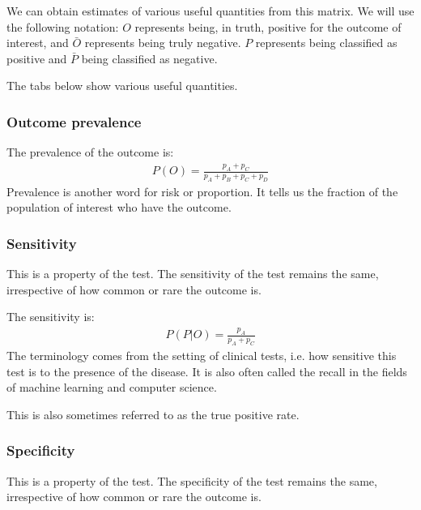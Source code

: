 \documentclass[letterpaper,10pt,english]{jupyterBook}
\begin{document}
\sphinxAtStartPar
We can obtain estimates of various useful quantities from this matrix. We will use the following notation: \(O\) represents being, in truth, positive for the outcome of interest, and \(\bar{O}\) represents being truly negative. \(P\) represents being classified as positive and \(\bar{P}\) being classified as negative.

\sphinxAtStartPar
The tabs below show various useful quantities.
\subsubsection*{Outcome prevalence}

\sphinxAtStartPar
The prevalence of the outcome is:
\begin{equation*}
\begin{split}
P(O) = \frac{p_A+p_C}{p_A+p_B+p_C+p_D}
\end{split}
\end{equation*}
\sphinxAtStartPar
Prevalence is another word for risk or proportion. It tells us the fraction of the population of interest who have the outcome.
\subsubsection*{Sensitivity}

\sphinxAtStartPar
This is a property of the test. The sensitivity of the test remains the same, irrespective of how common or rare the outcome is.

\sphinxAtStartPar
The sensitivity is:
\begin{equation*}
\begin{split}
P(P|O)=\frac{p_A}{p_A+p_C}
\end{split}
\end{equation*}
\sphinxAtStartPar
The terminology comes from the setting of clinical tests, i.e. how sensitive this test is to the presence of the disease. It is also often called the recall in the fields of machine learning and computer science.

\sphinxAtStartPar
This is also sometimes referred to as the true positive rate.
\subsubsection*{Specificity}

\sphinxAtStartPar
This is a property of the test. The specificity of the test remains the same, irrespective of how common or rare the outcome is.
\end{document}
